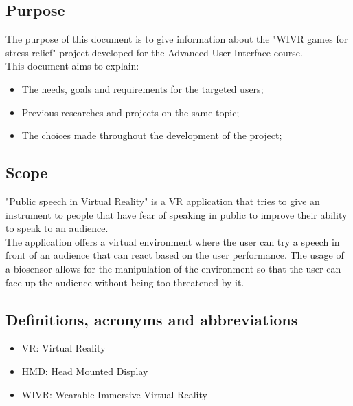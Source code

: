 \subsection{Purpose}
The purpose of this document is to give information about the "WIVR games for stress relief" project developed for the Advanced User Interface course.\\
This document aims to explain:
\begin{itemize}
	\item The needs, goals and requirements for the targeted users;
	\item Previous researches and projects on the same topic;
	\item The choices made throughout the development of the project;
\end{itemize}

\subsection{Scope}
"Public speech in Virtual Reality" is a VR application that tries to give an instrument to people that have fear of speaking in public to improve their ability to speak to an audience.\\
The application offers a virtual environment where the user can try a speech in front of an audience that can react based on the user performance. The usage of a biosensor allows for the manipulation of the environment so that the user can face up the audience without being too threatened by it. 
\subsection{Definitions, acronyms and abbreviations}
\begin{itemize}
	\item VR: Virtual Reality
	\item HMD: Head Mounted Display
	\item WIVR: Wearable Immersive Virtual Reality
\end{itemize}
